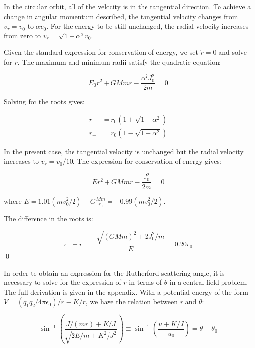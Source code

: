 \documentclass[12pt]{article}
\begin{document}
In the circular orbit, all of the velocity is in the tangential direction. To achieve a change in angular momentum described, the tangential velocity changes from $v_{\tau} = v_{0}$ to $\alpha v_{0}$. For the energy to be still unchanged, the radial velocity increases from zero to $v_{r} = \sqrt{1 - \alpha^{2}} v_{0}$. 

Given the standard expression for conservation of energy, we set $\dot{r} = 0$ and solve for $r$. The maximum and minimum radii satisfy the quadratic equation:

\begin{equation}
    E_{0}r^{2} + GMm r - \frac{\alpha^{2} J_{0}^{2}}{2m} = 0
\end{equation}

Solving for the roots gives:

\begin{equation}
\begin{split}
    r_{+} &= r_{0} \left( 1 + \sqrt{1 - \alpha^{2}} \right) \\
    r_{-} &= r_{0} \left( 1 - \sqrt{1 - \alpha^{2}} \right)
\end{split}
\end{equation}

In the present case, the tangential velocity is unchanged but the radial velocity increases to $v_{r} = v_{0}/10$. The expression for conservation of energy gives:

\begin{equation}
    Er^{2} + GMm r - \frac{J_{0}^{2}}{2m} = 0
\end{equation}

where $E = 1.01 (mv_{0}^{2}/2) - G \frac{Mm}{r_{0}} = -0.99 (mv_{0}^{2}/2)$.

The difference in the roots is:

\begin{equation}
    r_{+} - r_{-} = \frac{\sqrt{(GMm)^{2} + 2J_{0}^{2}/m}}{E} = 0.20 r_{0}
\end{equation}
\qed


In order to obtain an expression for the Rutherford scattering angle, it is necessary to solve for the expression of $r$ in terms of $\theta$ in a central field problem. The full derivation is given in the appendix. With a potential energy of the form $V = (q_{1}q_{2}/4\pi \epsilon_{0})/r \equiv K/r$, we have the relation between $r$ and $\theta$:

\begin{equation}
    \sin^{-1} \left( \frac{J/(mr) + K/J}{\sqrt{2E/m + K^{2}/J^{2}}} \right) \equiv \sin^{-1} \left( \frac{u + K/J}{u_{0}} \right) = \theta + \theta_{0}
\end{equation}
\end{document}
